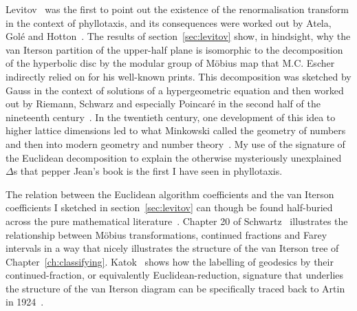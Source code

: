 Levitov~\cite{levitovFibonacciNumbersBotany1991} was the first to point out the existence of the renormalisation transform in the context of phyllotaxis, and its consequences were worked out by Atela, Golé and Hotton~\autocite{atelaDynamicalSystemPlant2002}. 
 The results of section~\ref{sec:levitov} show, in hindsight, why the van Iterson partition of the upper-half plane is isomorphic to the decomposition of the hyperbolic disc by the modular group of M{\"o}bius map that M.C. Escher indirectly relied on for his well-known prints. This decomposition was sketched by Gauss in the context of solutions of a hypergeometric equation and then worked out by Riemann,  Schwarz and especially Poincar\'{e} in the second half of the nineteenth century~\cite{gaussBemerkungFragmentenUber2011,poincarePapersFuchsianFunctions1985,schwarzUeberDiejenigenFalle1873,johnstillwellTranslatorNotePoincare1996}. 
  In the twentieth century, one development of this idea to higher lattice dimensions led to what Minkowski called the geometry of numbers and then into modern geometry and number theory~\cite{bergerGeometryRevealedJacob2010}.
My use of the signature of the Euclidean decomposition to explain the otherwise mysteriously unexplained $\Delta$s that pepper Jean's book is the first I have seen in phyllotaxis. 

The relation between the Euclidean algorithm coefficients and the van Iterson coefficients I sketched in section~\ref{sec:levitov} can though be found half-buried across the pure mathematical literature~\cite{conradIdealClassesSL22024}.   Chapter 20 of Schwartz~\cite{schwartzMostlySurfaces2011} illustrates the relationship between M\"obius transformations, continued fractions and Farey intervals in a way that nicely illustrates the structure of the van Iterson tree of Chapter~\ref{ch:classifying}. Katok~\cite{katokSymbolicDynamicsModular2007} shows how the labelling of geodesics by their continued-fraction, or equivalently Euclidean-reduction, signature  that underlies the structure of the van Iterson diagram can be specifically traced back to Artin in 1924~\cite{artinMechanischesSystemMit1924}. 
 

